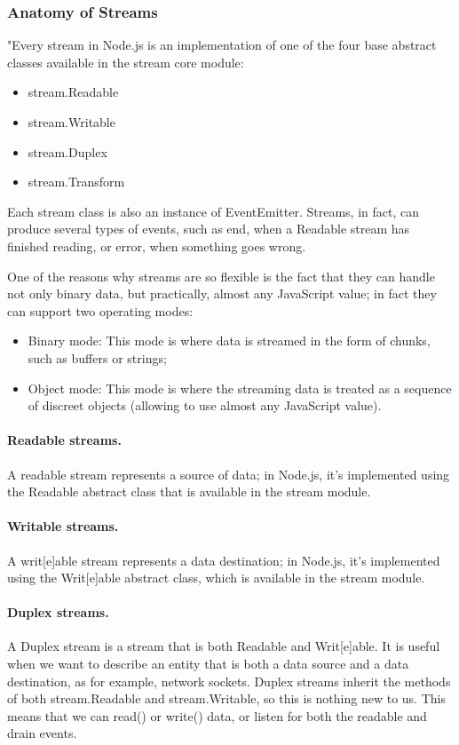 \documentclass{llncs}
\begin{document}
\subsubsection{Anatomy of Streams}
"Every stream in Node.js is an implementation of one of the four base abstract classes available in the stream core module:

\begin{itemize}
\item stream.Readable
\item stream.Writable
\item stream.Duplex
\item stream.Transform
\end{itemize}

Each stream class is also an instance of EventEmitter. 
Streams, in fact, can produce several types of events, such as end, when a Readable stream has finished reading, or error, when something goes wrong.

One of the reasons why streams are so flexible is the fact that they can handle not only binary data, but practically, almost any JavaScript value; in fact they can support two operating modes:
\begin{itemize}
\item Binary mode: This mode is where data is streamed in the form of chunks, such as buffers or strings;
\item Object mode: This mode is where the streaming data is treated as a sequence of discreet objects (allowing to use almost any JavaScript value).
\end{itemize}

\paragraph{Readable streams.}
A readable stream represents a source of data; in Node.js, it's implemented using the Readable abstract class that is available in the stream module.

\paragraph{Writable streams.}
A writ[e]able stream represents a data destination; in Node.js, it's implemented using the Writ[e]able abstract class, which is available in the stream module.

\paragraph{Duplex streams.}
A Duplex stream is a stream that is both Readable and Writ[e]able.
It is useful when we want to describe an entity that is both a data source and a data destination, as for example, network sockets. 
Duplex streams inherit the methods of both stream.Readable and stream.Writable, so this is nothing new to us. 
This means that we can read() or write() data, or listen for both the readable and drain events.
\end{document}
